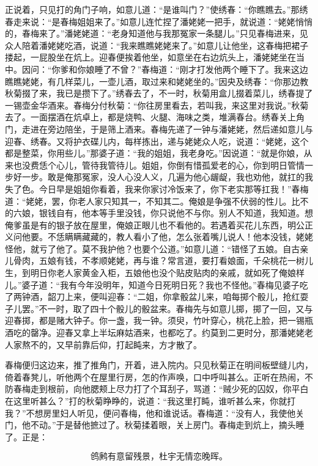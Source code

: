 正说着，只见打的角门子响，如意儿道：“是谁叫门？”使绣春：“你瞧瞧去。”那绣春走来说：“是春梅姐姐来了。”如意儿连忙捏了潘姥姥一把手，就说道：“姥姥悄悄的，春梅来了。”潘姥姥道：“老身知道他与我那冤家一条腿儿。”只见春梅进来，见众人陪着潘姥姥吃酒，说道：“我来瞧瞧姥姥来了。”如意儿让他坐，这春梅把裙子搂起，一屁股坐在炕上。迎春便挨着他坐，如意坐在右边炕头上，潘姥姥坐在当中。因问：“你爹和你娘睡了不曾？”春梅道：“刚才打发他两个睡下了。我来这边瞧瞧姥姥，有几样菜儿，一壶儿酒，取过来和姥姥坐的。”因央及绣春：“你那边教秋菊掇了来，我已是攒下了。”绣春去了，不一时，秋菊用盒儿掇着菜儿，绣春提了一锡壶金华酒来。春梅分付秋菊：“你往房里看去，若叫我，来这里对我说。”秋菊去了。一面摆酒在炕卓上，都是烧鸭、火腿、海味之类，堆满春台。绣春关上角门，走进在旁边陪坐，于是筛上酒来。春梅先递了一钟与潘姥姥，然后递如意儿与迎春、绣春。又将护衣碟儿内，每样拣出，递与姥姥众人吃，说道：“姥姥，这个都是整菜，你用些儿。”那婆子道：“我的姐姐，我老身吃。”因说道：“就是你娘，从来也没费恁个心儿，管待我管待儿。姐姐，你倒有惜孤爱老的心，你到明日管情一步好一步。敢是俺那冤家，没人心没人义，几遍为他心龌龊，我也劝他，就扛的我失了色。今日早是姐姐你看着，我来你家讨冷饭来了，你下老实那等扛我！”春梅道：“姥姥，罢，你老人家只知其一，不知其二。俺娘是争强不伏弱的性儿。比不的六娘，银钱自有，他本等手里没钱，你只说他不与你。别人不知道，我知道。想俺爹虽是有的银子放在屋里，俺娘正眼儿也不看他的。若遇着买花儿东西，明公正义问他要。不恁瞒瞒藏藏的，教人看小了他，怎么张着嘴儿说人！他本没钱，姥姥怪他，就亏了他了。莫不我护他？也要个公道。”如意儿道：“错怪了五娘。自古亲儿骨肉，五娘有钱，不孝顺姥姥，再与谁？常言道，要打看娘面，千朵桃花一树儿生，到明日你老人家黄金入柜，五娘他也没个贴皮贴肉的亲戚，就如死了俺娘样儿。”婆子道：“我有今年没明年，知道今日死明日死？我也不怪他。”春梅见婆子吃了两钟酒，韶刀上来，便叫迎春：“二姐，你拿骰盆儿来，咱每掷个骰儿，抢红耍子儿罢。”不一时，取了四十个骰儿的骰盆来。春梅先与如意儿掷，掷了一回，又与迎春掷，都是赌大钟子。你一盏，我一钟。须臾，竹叶穿心，桃花上脸，把一锡瓶酒吃的罄净。迎春又拿上半坛麻姑酒来，也都吃了。约莫到二更时分，那潘姥姥老人家熬不的，又早前靠后仰，打起盹来，方才散了。

春梅便归这边来，推了推角门，开着，进入院内。只见秋菊正在明间板壁缝儿内，倚着春凳儿，听他两个在屋里行房，怎的作声唤，口中呼叫甚么。正听在热闹，不防春梅走到根前，向他腮颊上尽力打了个耳刮子，骂道：“贼少死的囚奴，你平白在这里听甚么？”打的秋菊睁睁的，说道：“我这里打盹，谁听甚么来，你就打我？”不想房里妇人听见，便问春梅，他和谁说话。春梅道：“没有人，我使他关门，他不动。”于是替他摭过了。秋菊揉着眼，关上房门。春梅走到炕上，摘头睡了。正是：

\[
鸧鹒有意留残景，杜宇无情恋晚晖。
\]

